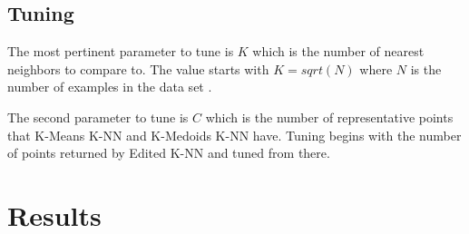 \documentclass[twoside,11pt]{article}
\begin{document}
\subsection{Tuning}

The most pertinent parameter to tune is $K$ which is the number of nearest neighbors to compare to. The value starts with $K = sqrt(N)$ where $N$ is the number of examples in the data set \citep{learning-k}.

The second parameter to tune is $C$ which is the number of representative points that K-Means K-NN and K-Medoids K-NN have. Tuning begins with the number of points returned by Edited K-NN and tuned from there.

\section{Results}
\end{document}
